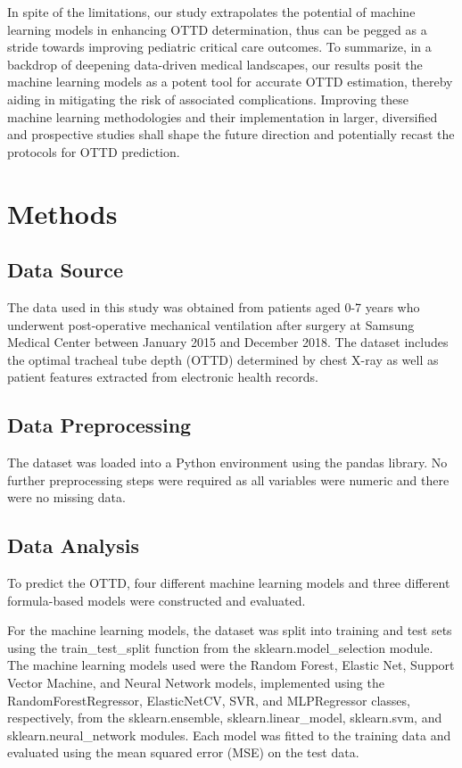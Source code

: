 \documentclass[11pt]{article}
\begin{document}
In spite of the limitations, our study extrapolates the potential of machine learning models in enhancing OTTD determination, thus can be pegged as a stride towards improving pediatric critical care outcomes. To summarize, in a backdrop of deepening data-driven medical landscapes, our results posit the machine learning models as a potent tool for accurate OTTD estimation, thereby aiding in mitigating the risk of associated complications. Improving these machine learning methodologies and their implementation in larger, diversified and prospective studies \cite{Lee2017EffectsOM} shall shape the future direction and potentially recast the protocols for OTTD prediction.

\section*{Methods}

\subsection*{Data Source}
The data used in this study was obtained from patients aged 0-7 years who underwent post-operative mechanical ventilation after surgery at Samsung Medical Center between January 2015 and December 2018. The dataset includes the optimal tracheal tube depth (OTTD) determined by chest X-ray as well as patient features extracted from electronic health records.

\subsection*{Data Preprocessing}
The dataset was loaded into a Python environment using the pandas library. No further preprocessing steps were required as all variables were numeric and there were no missing data.

\subsection*{Data Analysis}
To predict the OTTD, four different machine learning models and three different formula-based models were constructed and evaluated.

For the machine learning models, the dataset was split into training and test sets using the train\_test\_split function from the sklearn.model\_selection module. The machine learning models used were the Random Forest, Elastic Net, Support Vector Machine, and Neural Network models, implemented using the RandomForestRegressor, ElasticNetCV, SVR, and MLPRegressor classes, respectively, from the sklearn.ensemble, sklearn.linear\_model, sklearn.svm, and sklearn.neural\_network modules. Each model was fitted to the training data and evaluated using the mean squared error (MSE) on the test data.
\end{document}
